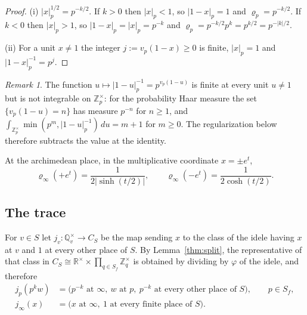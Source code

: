 \documentclass[11pt]{amsart}
\theoremstyle{definition}
\theoremstyle{remark}
\newtheorem{remark}[theorem]{Remark}
\newcommand{\R}{\mathbb R}
\newcommand{\Z}{\mathbb Z}
\newcommand{\Q}{\mathbb Q}
\begin{document}
\begin{proof}
(i) $|x|_p^{1/2}=p^{-k/2}$.  If $k>0$ then $|x|_p<1$, so $|1-x|_p=1$ and
$\varrho_p=p^{-k/2}$.  If $k<0$ then $|x|_p>1$, so $|1-x|_p=|x|_p=p^{-k}$ and
$\varrho_p=p^{-k/2}p^{k}=p^{k/2}=p^{-|k|/2}$.

(ii) For a unit $x\ne1$ the integer $j:=v_p(1-x)\ge0$ is finite,
$|x|_p=1$ and $|1-x|_p^{-1}=p^{j}$.
\end{proof}

\begin{remark}\label{rem:unitdiv}
The function $u\mapsto|1-u|_p^{-1}=p^{v_p(1-u)}$ is finite at every unit
$u\ne1$ but is not integrable on $\Z_p^{\times}$: for the probability Haar
measure the set $\{v_p(1-u)=n\}$ has measure $p^{-n}$ for $n\ge1$, and
$\int_{\Z_p^{\times}}\min(p^{m},|1-u|_p^{-1})\,du=m+1$ for $m\ge0$.  The regularization
below therefore subtracts the value at the identity.
\end{remark}

At the archimedean place, in the multiplicative coordinate $x=\pm e^{t}$,
\begin{equation}\label{eq:tauinf}
\varrho_{\infty}(+e^{t})=\frac{1}{2|\sinh(t/2)|},\qquad
\varrho_{\infty}(-e^{t})=\frac{1}{2\cosh(t/2)} .
\end{equation}

\subsection{The trace}

For $v\in S$ let $j_v:\Q_v^{\times}\to C_S$ be the map sending $x$ to the class
of the idele having $x$ at $v$ and $1$ at every other place of $S$.  By
Lemma~\ref{thm:split}, the representative of that class in
$C_S\cong\R^{\times}\times\prod_{q\in S_f}\Z_q^{\times}$ is obtained by
dividing by $\varphi$ of the idele, and therefore
\begin{equation}\label{eq:slices}
\begin{aligned}
j_p(p^{k}w)&=\bigl(p^{-k}\text{ at }\infty,\ w\text{ at }p,\
p^{-k}\text{ at every other place of }S\bigr),\qquad p\in S_f,\\
j_{\infty}(x)&=\bigl(x\text{ at }\infty,\ 1\text{ at every finite place of }S
\bigr).
\end{aligned}
\end{equation}
\end{document}
